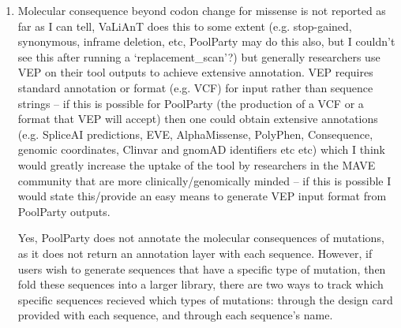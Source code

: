 \documentclass[11pt]{article}
\newenvironment{response}{\par\color{responseblue}}{\par}
\newenvironment{msquote}
  {\begin{quote}\color{responseblue}\itshape\noindent\ignorespaces}
  {\end{quote}}
\begin{document}
\begin{enumerate}



\item Molecular consequence beyond codon change for missense is not reported as
far as I can tell, VaLiAnT does this to some extent (e.g. stop-gained,
synonymous, inframe deletion, etc, PoolParty may do this also, but I couldn't
see this after running a `replacement\_scan'?) but generally researchers use VEP
on their tool outputs to achieve extensive annotation. VEP requires standard
annotation or format (e.g. VCF) for input rather than sequence strings -- if
this is possible for PoolParty (the production of a VCF or a format that VEP
will accept) then one could obtain extensive annotations (e.g. SpliceAI
predictions, EVE, AlphaMissense, PolyPhen, Consequence, genomic coordinates,
Clinvar and gnomAD identifiers etc etc) which I think would greatly increase the
uptake of the tool by researchers in the MAVE community that are more
clinically/genomically minded -- if this is possible I would state this/provide
an easy means to generate VEP input format from PoolParty outputs.

\begin{response}
Yes, PoolParty does not annotate the molecular consequences of mutations, as it does not return an annotation layer with each sequence. However, if users wish to generate sequences that have a specific type of mutation, then fold these sequences into a larger library, there are two ways to track which specific sequences recieved which types of mutations: through the design card provided with each sequence, and through each sequence's name.


\end{response}
\end{enumerate}
\end{document}

